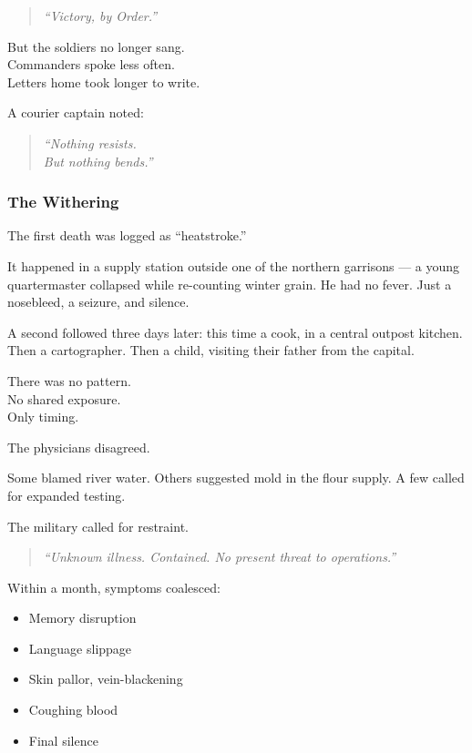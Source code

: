 \documentclass[12pt]{article}
\begin{document}
\begin{quote}
\textit{“Victory, by Order.”}
\end{quote}

\vspace{1em}

But the soldiers no longer sang.\\
Commanders spoke less often.\\
Letters home took longer to write.

A courier captain noted:

\begin{quote}
\textit{“Nothing resists.}\\
\textit{But nothing bends.”}
\end{quote}

\dotfill

\subsubsection*{The Withering}

The first death was logged as “heatstroke.”

It happened in a supply station outside one of the northern garrisons — a young quartermaster collapsed while re-counting winter grain. He had no fever. Just a nosebleed, a seizure, and silence.

A second followed three days later: this time a cook, in a central outpost kitchen. Then a cartographer. Then a child, visiting their father from the capital.

There was no pattern.\\
No shared exposure.\\
Only timing.

\vspace{1em}

The physicians disagreed.

Some blamed river water. Others suggested mold in the flour supply. A few called for expanded testing.

The military called for restraint.

\begin{quote}
\textit{“Unknown illness. Contained. No present threat to operations.”}
\end{quote}

\vspace{1em}

Within a month, symptoms coalesced:

\begin{itemize}
  \item Memory disruption
  \item Language slippage
  \item Skin pallor, vein-blackening
  \item Coughing blood
  \item Final silence
\end{itemize}
\end{document}
